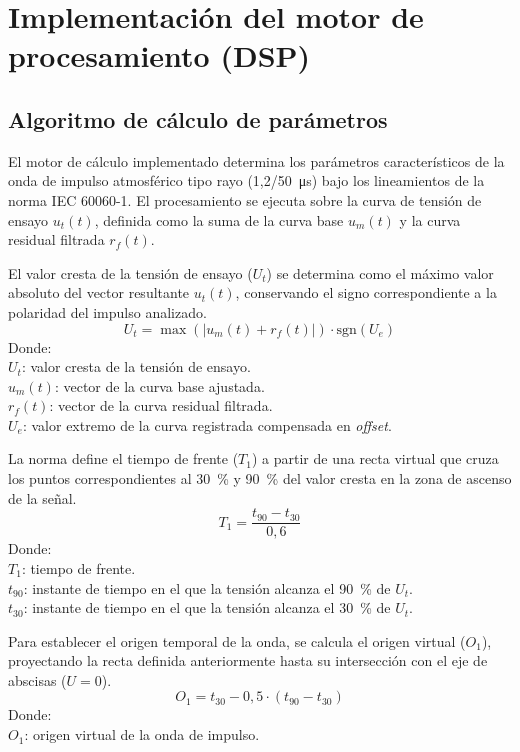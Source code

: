 \newpage
\chapter{Implementación del motor de procesamiento (DSP)}
\vspace{3\baselineskip}

\section{Algoritmo de cálculo de parámetros}
El motor de cálculo implementado determina los parámetros característicos de la onda de impulso atmosférico tipo rayo (\SI[parse-numbers=false]{1,2/50}{\micro\second}) bajo los lineamientos de la norma IEC 60060-1. El procesamiento se ejecuta sobre la curva de tensión de ensayo $u_t(t)$, definida como la suma de la curva base $u_m(t)$ y la curva residual filtrada $r_f(t)$.\par
El valor cresta de la tensión de ensayo ($U_t$) se determina como el máximo valor absoluto del vector resultante $u_t(t)$, conservando el signo correspondiente a la polaridad del impulso analizado.
\begin{equation}
    U_t = \max(|u_m(t) + r_f(t)|) \cdot \text{sgn}(U_e)
    \label{eq:Ut_calculation}
\end{equation}
Donde:\\
$U_t$: valor cresta de la tensión de ensayo.\\
$u_m(t)$: vector de la curva base ajustada.\\
$r_f(t)$: vector de la curva residual filtrada.\\
$U_e$: valor extremo de la curva registrada compensada en \textit{offset}.

La norma define el tiempo de frente ($T_1$) a partir de una recta virtual que cruza los puntos correspondientes al \SI{30}{\percent} y \SI{90}{\percent} del valor cresta en la zona de ascenso de la señal.
\begin{equation}
    T_1 = \frac{t_{90} - t_{30}}{0,6}
    \label{eq:T1_calculation}
\end{equation}
Donde:\\
$T_1$: tiempo de frente.\\
$t_{90}$: instante de tiempo en el que la tensión alcanza el \SI{90}{\percent} de $U_t$.\\
$t_{30}$: instante de tiempo en el que la tensión alcanza el \SI{30}{\percent} de $U_t$.

Para establecer el origen temporal de la onda, se calcula el origen virtual ($O_1$), proyectando la recta definida anteriormente hasta su intersección con el eje de abscisas ($U=0$).
\begin{equation}
    O_1 = t_{30} - 0,5 \cdot (t_{90} - t_{30})
    \label{eq:O1_calculation}
\end{equation}
Donde:\\
$O_1$: origen virtual de la onda de impulso.

